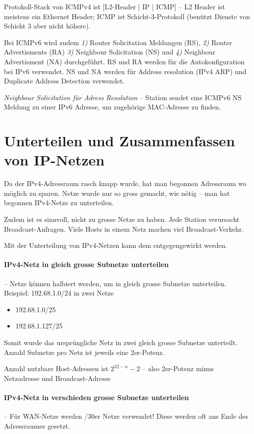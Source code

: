 \documentclass[a4paper,12pt]{article}
\begin{document}
Protokoll-Stack von ICMPv4 ist [L2-Header $|$ IP $|$ ICMP] -- L2 Header ist meistens ein Ethernet Header; ICMP ist Schicht-3-Protokoll (benützt Dienste von Schicht 3 aber nicht höhere).

Bei ICMPv6 wird zudem \emph{1)} Router Solicitation Meldungen (RS),  \emph{2)} Router Advertisments (RA) \emph{3)} Neighbour Solicitation (NS) und \emph{4)} Neighbour Advertisment (NA) durchgeführt.
RS und RA werden für die Autokonfiguration bei IPv6 verwendet. NS und NA werden für Address resolution (IPv4 ARP) und Duplicate Address Detection verwendet.

\emph{Neighbour Solicitation für Adress Resolution} -- Station sendet eine ICMPv6 NS Meldung zu einer IPv6 Adresse, um zugehörige MAC-Adresse zu finden.

\newpage
\section{Unterteilen und Zusammenfassen von IP-Netzen}
Da der IPv4-Adressraum rasch knapp wurde, hat man begonnen Adressraum wo möglich zu sparen. Netze wurde nur so gross gemacht, wie nötig -- man hat begonnen IPv4-Netze zu unterteilen.

Zudem ist es sinnvoll, nicht zu grosse Netze zu haben. Jede Station verursacht Broadcast-Anfragen. Viele Hosts in einem Netz machen viel Broadcast-Verkehr.

Mit der Unterteilung von IPv4-Netzen kann dem entgegengewirkt werden.

\paragraph{IPv4-Netz in gleich grosse Subnetze unterteilen} -- Netze können halbiert werden, um in gleich grosse Subnetze unterteilen.
Beispiel: 192.68.1.0/24 in zwei Netze
\begin{itemize}
\item 192.68.1.0/25
\item 192.68.1.127/25
\end{itemize}
Somit wurde das ursprüngliche Netz in zwei gleich grosse Subnetze unterteilt. Anzahl Subnetze pro Netz ist jeweils eine 2er-Potenz.

Anzahl nutzbare Host-Adressen ist $2^{32-n} - 2$ -- also 2er-Potenz minus Netzadresse und Broadcast-Adresse

\paragraph{IPv4-Netz in verschieden grosse Subnetze unterteilen} -- Für WAN-Netze werden /30er Netze verwendet! Diese werden oft ans Ende des Adressraumes gesetzt.
\end{document}
